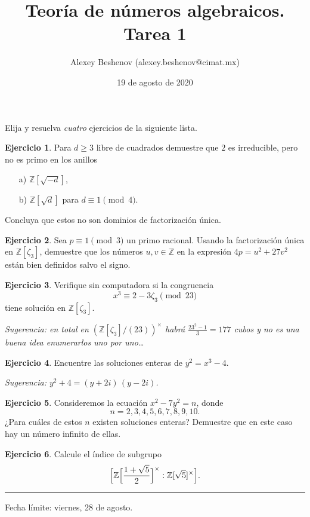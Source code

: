 \documentclass{article}
\title{Teoría de números algebraicos. Tarea 1}
\author{Alexey Beshenov (alexey.beshenov@cimat.mx)}
\date{19 de agosto de 2020}
\newcounter{tarea}
\theoremstyle{definition}
\newtheorem{ejercicio}{Ejercicio}[tarea]
\begin{document}
\maketitle

\thispagestyle{empty}

\noindent Elija y resuelva \emph{cuatro} ejercicios de la siguiente lista.

\begin{ejercicio}
  Para $d \ge 3$ libre de cuadrados demuestre que $2$ es irreducible,
  pero no es primo en los anillos
  \begin{enumerate}
  \item[a)] $\mathbb{Z} [\sqrt{-d}]$,
  \item[b)] $\mathbb{Z} [\sqrt{d}]$ para $d \equiv 1 \pmod{4}$.
  \end{enumerate}

  Concluya que estos no son dominios de factorización única.
\end{ejercicio}

\begin{ejercicio}
  Sea $p \equiv 1 \pmod{3}$ un primo racional. Usando la factorización única
  en $\mathbb{Z} [\zeta_3]$, demuestre que los números $u,v \in \mathbb{Z}$ en
  la expresión $4p = u^2 + 27 v^2$ están bien definidos salvo el signo.
\end{ejercicio}

\begin{ejercicio}
  Verifique sin computadora si la congruencia
  $$x^3 \equiv 2 - 3\zeta_3 \pmod{23}$$
  tiene solución en $\mathbb{Z} [\zeta_3]$.

  \emph{Sugerencia: en total en $(\mathbb{Z} [\zeta_3]/(23))^\times$ habrá
    $\frac{23^2 - 1}{3} = 177$ cubos y no es una buena idea enumerarlos uno por
    uno\dots}
\end{ejercicio}

\begin{ejercicio}
  Encuentre las soluciones enteras de $y^2 = x^3 - 4$.

  \emph{Sugerencia: $y^2 + 4 = (y + 2i)\,(y - 2i)$.}
\end{ejercicio}

\begin{ejercicio}
  Consideremos la ecuación $x^2 - 7y^2 = n$, donde
  $$n = 2,3,4,5,6,7,8,9,10.$$
  ¿Para cuáles de estos $n$ existen soluciones enteras?
  Demuestre que en este caso hay un número infinito de ellas.
\end{ejercicio}

\begin{ejercicio}
  Calcule el índice de subgrupo
  \[ \Bigl[ \mathbb{Z} \Bigl[\frac{1+\sqrt{5}}{2}\Bigr]^\times :
            \mathbb{Z} [\sqrt{5}]^\times \Bigr]. \]
\end{ejercicio}

\noindent\rule{50pt}{1pt}

\noindent Fecha límite: viernes, 28 de agosto.
\end{document}
